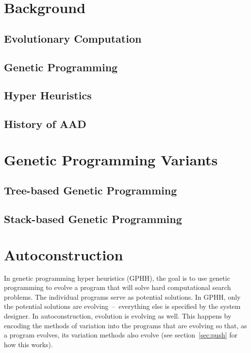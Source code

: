 \documentclass{sig-alternate}
\begin{document}
\section{Background}
\label{sec:background}

\subsection{Evolutionary Computation}
\label{sec:evocomp}

\subsection{Genetic Programming}
\label{sec:GP}

\subsection{Hyper Heuristics}
\label{sec:HH}

\subsection{History of AAD}
\label{sec:history}

\section{Genetic Programming Variants}
\label{sec:gpvariants}

\subsection{Tree-based Genetic Programming}
\label{sec:tgp}

\subsection{Stack-based Genetic Programming}
\label{sec:sgp}

\section{Autoconstruction}
\label{sec:ac}
In genetic programming hyper heuristics (GPHH), the goal is to use genetic programming to evolve a program that will solve hard computational search problems. The individual programs serve as potential solutions. In GPHH, only the potential solutions are evolving~--~everything else is specified by the system designer.  In autoconstruction, evolution is evolving as well. This happens by encoding the methods of variation into the programs that are evolving so that, as a program evolves, its variation methods also evolve (see section~\ref{sec:push} for how this works).
\end{document}

